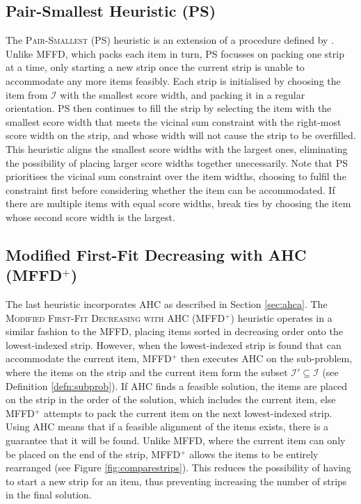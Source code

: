 \documentclass[oribibl]{llncs}
\begin{document}
\subsection{Pair-Smallest Heuristic (PS)}
\label{sec:ps}

The \textsc{Pair-Smallest} (PS) heuristic is an extension of a procedure defined by \cite{lewis2011}. Unlike MFFD, which packs each item in turn, PS focusses on packing one strip at a time, only starting a new strip once the current strip is unable to accommodate any more items feasibly. Each strip is initialised by choosing the item from $\mathcal{I}$ with the smallest score width, and packing it in a regular orientation. PS then continues to fill the strip by selecting the item with the smallest score width that meets the vicinal sum constraint with the right-most score width on the strip, and whose width will not cause the strip to be overfilled. This heuristic aligns the smallest score widths with the largest ones, eliminating the possibility of placing larger score widths together unecessarily. Note that PS prioritises the vicinal sum constraint over the item widths, choosing to fulfil the constraint first before considering whether the item can be accommodated. If there are multiple items with equal score widths, break ties by choosing the item whose second score width is the largest.



\subsection{Modified First-Fit Decreasing with AHC (MFFD$^+$)}
\label{sec:mffd+}

The last heuristic incorporates AHC as described in Section \ref{sec:ahca}. The \textsc{Modified First-Fit Decreasing with AHC} (MFFD$^+$) heuristic operates in a similar fashion to the MFFD, placing items sorted in decreasing order onto the lowest-indexed strip. However, when the lowest-indexed strip is found that can accommodate the current item, MFFD$^+$ then executes AHC on the sub-problem, where the items on the strip and the current item form the subset $\mathcal{I}' \subseteq \mathcal{I}$ (see Definition \ref{defn:subprob}). If AHC finds a feasible solution, the items are placed on the strip in the order of the solution, which includes the current item, else MFFD$^+$ attempts to pack the current item on the next lowest-indexed strip. Using AHC means that if a feasible alignment of the items exists, there is a guarantee that it will be found. Unlike MFFD, where the current item can only be placed on the end of the strip, MFFD$^+$ allows the items to be entirely rearranged (see Figure \ref{fig:comparestrips}). This reduces the possibility of having to start a new strip for an item, thus preventing increasing the number of strips in the final solution.
\end{document}
